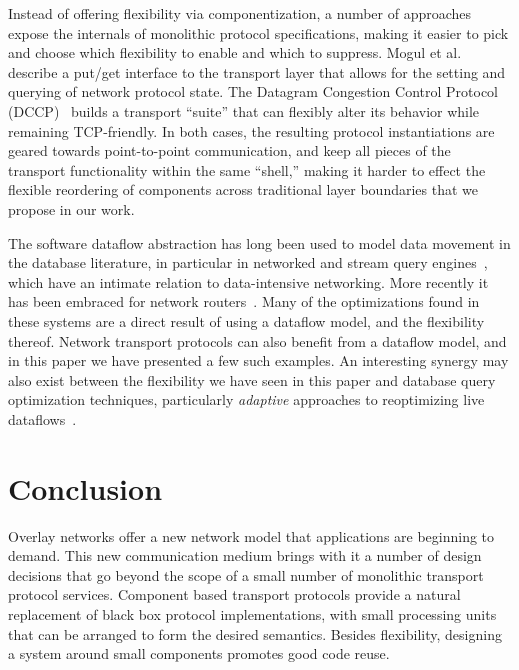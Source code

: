 Instead of offering flexibility via componentization, a number of
approaches expose the internals of monolithic protocol specifications,
making it easier to pick and choose which flexibility to enable and
which to suppress. 
Mogul et al.~\cite{unveiling} describe a put/get interface to the transport layer that allows for the setting
and querying of network protocol state.
The Datagram Congestion Control Protocol (DCCP)~\cite{dccp} builds a
transport ``suite'' that can flexibly alter its behavior
while remaining TCP-friendly. In both cases, the resulting protocol
instantiations are geared towards point-to-point communication, and
keep all pieces of the transport functionality within the same
``shell,'' making it harder to effect the flexible reordering of
components across traditional layer boundaries that we
propose in our work.

The software dataflow abstraction has long been used to model data
movement in the database literature, in particular in
networked and stream query engines~\cite{telegraphcq,aurora}, which
have an intimate relation to data-intensive networking.  More recently
it has been embraced for network
routers~\cite{click-tocs,handley05xorp}.  Many of the 
optimizations found in these systems are a direct result of using a
dataflow model, and the flexibility thereof.  Network
transport protocols can also benefit from a dataflow model, and in
this paper we have presented a few such examples.  An interesting
synergy may also exist between the flexibility we have seen in this paper
and database query optimization techniques, particularly {\em
  adaptive} approaches to reoptimizing live
dataflows~\cite{telegraphcq,babu-cidr05}.


\section{Conclusion}
\label{sec:discussion}

Overlay networks offer a new network model that applications are beginning 
to demand. This new communication medium brings with it a number of design 
decisions that go beyond the scope of a small number of monolithic
transport protocol services. Component based transport protocols
provide a natural replacement of black box protocol implementations,
with small processing units that can be arranged to form the desired
semantics. Besides flexibility, designing a system around small components promotes
good code reuse.


